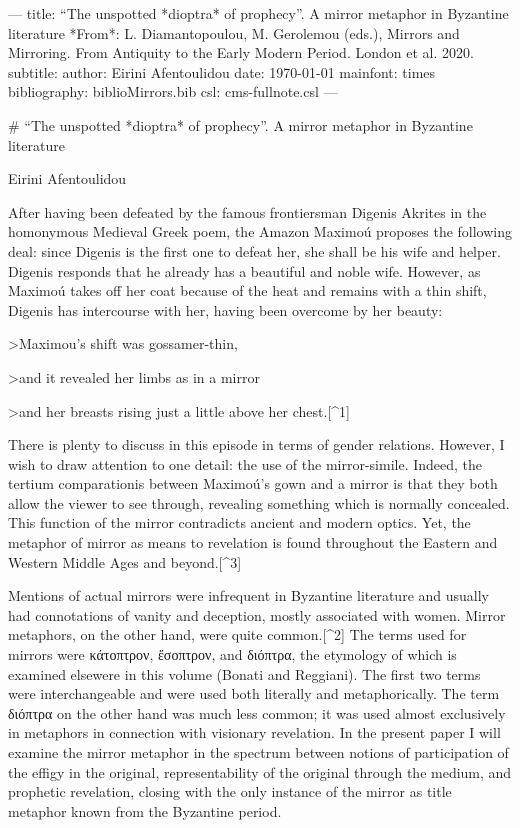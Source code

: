 ---
title: “The unspotted *dioptra* of prophecy”. A mirror metaphor in Byzantine literature
    *From*: L. Diamantopoulou, M. Gerolemou (eds.), Mirrors and Mirroring. From Antiquity to the Early Modern Period. London et al. 2020.
subtitle: 
author: Eirini Afentoulidou
date: \today
mainfont: times
bibliography: biblioMirrors.bib
csl: cms-fullnote.csl
---

# “The unspotted *dioptra* of prophecy”. A mirror metaphor in Byzantine literature

Eirini Afentoulidou

After having been defeated by the famous frontiersman Digenis Akrites in the homonymous Medieval Greek poem, the Amazon Maximoú proposes the following deal: since Digenis is the first one to defeat her, she shall be his wife and helper. Digenis responds that he already has a beautiful and noble wife. However, as Maximoú takes off her coat because of the heat and remains with a thin shift, Digenis has intercourse with her, having been overcome by her beauty:

>Maximou’s shift was gossamer-thin,

>and it revealed her limbs as in a mirror

>and her breasts rising just a little above her chest.[^1]

There is plenty to discuss in this episode in terms of gender relations. However, I wish to draw attention to one detail: the use of the mirror-simile. Indeed, the tertium comparationis between Maximoú’s gown and a mirror is that they both allow the viewer to see through, revealing something which is normally concealed. This function of the mirror contradicts ancient and modern optics. Yet, the metaphor of mirror as means to revelation is found throughout the Eastern and Western Middle Ages and beyond.[^3]

Mentions of actual mirrors were infrequent in Byzantine literature and usually had connotations of vanity and deception, mostly associated with women. Mirror metaphors, on the other hand, were quite common.[^2] The terms used for mirrors were κάτοπτρον, ἔσοπτρον, and διόπτρα, the etymology of which is examined elsewere in this volume (Bonati and Reggiani). The first two terms were interchangeable and were used both literally and metaphorically. The term διόπτρα on the other hand was much less common; it was used almost exclusively in metaphors in connection with visionary revelation. In the present paper I will examine the mirror metaphor in the spectrum between notions of participation of the effigy in the original, representability of the original through the medium, and prophetic revelation, closing with the only instance of the mirror as title metaphor known from the Byzantine period.

